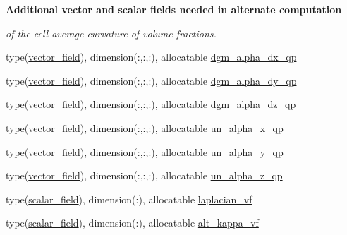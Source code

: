 \begin{Indent}\textbf{ Additional vector and scalar fields needed in alternate computation}\par
{\em of the cell-\/average curvature of volume fractions. }\begin{DoxyCompactItemize}
\item 
type(\hyperlink{structm__derived__types_1_1vector__field}{vector\+\_\+field}), dimension(\+:,\+:,\+:), allocatable \hyperlink{namespacem__rhs_a1ecb03602517ea0c6a8594ac84d7baf6}{dgm\+\_\+alpha\+\_\+dx\+\_\+qp}
\item 
type(\hyperlink{structm__derived__types_1_1vector__field}{vector\+\_\+field}), dimension(\+:,\+:,\+:), allocatable \hyperlink{namespacem__rhs_ada84d050bc469e99491f0df609abae94}{dgm\+\_\+alpha\+\_\+dy\+\_\+qp}
\item 
type(\hyperlink{structm__derived__types_1_1vector__field}{vector\+\_\+field}), dimension(\+:,\+:,\+:), allocatable \hyperlink{namespacem__rhs_ade3320ea2b49d294014da588f54e09b4}{dgm\+\_\+alpha\+\_\+dz\+\_\+qp}
\item 
type(\hyperlink{structm__derived__types_1_1vector__field}{vector\+\_\+field}), dimension(\+:,\+:,\+:), allocatable \hyperlink{namespacem__rhs_a7b00376acfcaf5c7628428725986f223}{un\+\_\+alpha\+\_\+x\+\_\+qp}
\item 
type(\hyperlink{structm__derived__types_1_1vector__field}{vector\+\_\+field}), dimension(\+:,\+:,\+:), allocatable \hyperlink{namespacem__rhs_a2b0b138349cb9c896cb7985bdcedafe1}{un\+\_\+alpha\+\_\+y\+\_\+qp}
\item 
type(\hyperlink{structm__derived__types_1_1vector__field}{vector\+\_\+field}), dimension(\+:,\+:,\+:), allocatable \hyperlink{namespacem__rhs_aa0d0342fdf7c5d5f795c151fc10d1cee}{un\+\_\+alpha\+\_\+z\+\_\+qp}
\item 
type(\hyperlink{structm__derived__types_1_1scalar__field}{scalar\+\_\+field}), dimension(\+:), allocatable \hyperlink{namespacem__rhs_aa2587a1fc99a23d4d7fe552602e72bbc}{laplacian\+\_\+vf}
\item 
type(\hyperlink{structm__derived__types_1_1scalar__field}{scalar\+\_\+field}), dimension(\+:), allocatable \hyperlink{namespacem__rhs_adf9ba6fc1bd79727d1f7ce5fe7a302ed}{alt\+\_\+kappa\+\_\+vf}
\end{DoxyCompactItemize}
\end{Indent}
